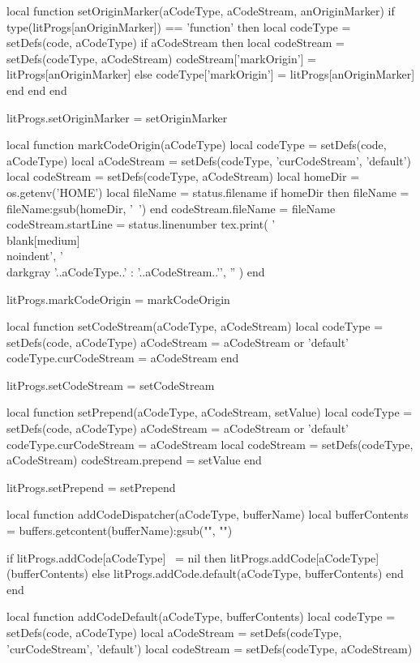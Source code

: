 \startLuaCode
local function setOriginMarker(aCodeType, aCodeStream, anOriginMarker)
  if type(litProgs[anOriginMarker]) == 'function' then
    local codeType  = setDefs(code, aCodeType)
    if aCodeStream then
      local codeStream = setDefs(codeType, aCodeStream)
      codeStream['markOrigin'] = litProgs[anOriginMarker]
    else
      codeType['markOrigin'] = litProgs[anOriginMarker]
    end
  end
end

litProgs.setOriginMarker = setOriginMarker

local function markCodeOrigin(aCodeType)
  local codeType         = setDefs(code, aCodeType)
  local aCodeStream      = setDefs(codeType, 'curCodeStream', 'default')
  local codeStream       = setDefs(codeType, aCodeStream)
  local homeDir          = os.getenv('HOME')
  local fileName         = status.filename
  if homeDir then
    fileName = fileName:gsub(homeDir, '~')
  end
  codeStream.fileName    = fileName
  codeStream.startLine   = status.linenumber
  tex.print({
   '\\blank[medium]\\noindent',
   '{\\darkgray '..aCodeType..' : '..aCodeStream..'}',
   ''
   })
end

litProgs.markCodeOrigin = markCodeOrigin

local function setCodeStream(aCodeType, aCodeStream)
  local codeType         = setDefs(code, aCodeType)
  aCodeStream            = aCodeStream or 'default'
  codeType.curCodeStream = aCodeStream
end

litProgs.setCodeStream = setCodeStream

local function setPrepend(aCodeType, aCodeStream, setValue)
  local codeType         = setDefs(code, aCodeType)
  aCodeStream            = aCodeStream or 'default'
  codeType.curCodeStream = aCodeStream
  local codeStream       = setDefs(codeType, aCodeStream)
  codeStream.prepend     = setValue
end

litProgs.setPrepend = setPrepend

local function addCodeDispatcher(aCodeType, bufferName)
  local bufferContents  =
    buffers.getcontent(bufferName):gsub("", "\n")

  if litProgs.addCode[aCodeType] ~= nil then
    litProgs.addCode[aCodeType](bufferContents)
  else
    litProgs.addCode.default(aCodeType, bufferContents)
  end
end

local function addCodeDefault(aCodeType, bufferContents)
  local codeType        = setDefs(code, aCodeType)
  local aCodeStream     = setDefs(codeType, 'curCodeStream', 'default')
  local codeStream      = setDefs(codeType, aCodeStream)

